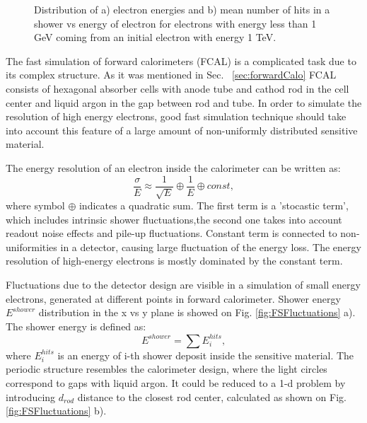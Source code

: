 \begin{figure}[!tbp]
\begin{minipage}[h]{0.49\linewidth}
\end{minipage}
\hfill
\begin{minipage}[h]{0.49\linewidth}
\end{minipage}
\caption{Distribution  of a) electron energies and b) mean number of hits in a shower vs energy of electron for electrons with energy less than 1 GeV coming from an initial electron with energy 1 TeV. }
\label{fig:TrackEnergy}
\end{figure}

The fast simulation of forward calorimeters (FCAL) is a complicated task due to its complex structure. As it was mentioned in Sec. ~\ref{sec:forwardCalo} FCAL consists of hexagonal absorber cells with anode tube and cathod rod in the cell center and liquid argon in the gap between rod and tube. In order to simulate the resolution of high energy electrons, good fast simulation technique should take into account this feature of a large amount of non-uniformly distributed sensitive material.

The energy resolution of an electron inside the calorimeter can be written as:
\begin{equation}\label{eq:EMResoultion}
\frac{\sigma}{E} \approx \frac{1}{\sqrt{E}}	\oplus \frac{1}{E} 	\oplus const,
\end{equation}
where symbol $\oplus$ indicates a quadratic sum. The first term is a 'stocastic term', which includes intrinsic shower fluctuations,the second  one takes into account readout noise effects and pile-up fluctuations. Constant term is connected to non-uniformities in a detector, causing large fluctuation of the energy loss. The energy resolution of high-energy electrons is mostly dominated by the constant term. 

Fluctuations due to the detector design are visible in a simulation of small energy electrons, generated at different points in forward calorimeter. Shower energy $E^{shower}$ distribution in the x vs y plane is showed on Fig. \ref{fig:FSFluctuations} a). The shower energy is defined as:
\begin{equation}
E^{shower}=\sum E_i^{hits},
\end{equation}
where $E_i^{hits}$ is an energy of i-th shower deposit inside the sensitive material. The periodic structure resembles the calorimeter design, where the light circles correspond to gaps with liquid argon. It could be reduced to a 1-d problem by introducing $d_{rod}$ distance to the closest rod center, calculated as shown on Fig. \ref{fig:FSFluctuations} b).

